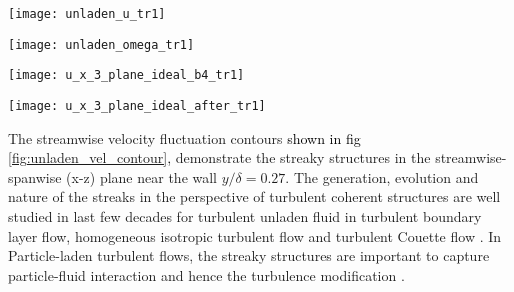 \documentclass[aip,graphicx]{revtex4-1}
\begin{document}
\begin{figure*}[!h]
\centering
\texttt{[image: unladen\_u\_tr1]}
	\caption{Contours of streamwise velocity fluctuations in unladen fluid phase showed in three different planes as shown in the figures} 
	\label{fig:unladen_vel_contour}
\end{figure*}
\begin{figure*}[!h]
\centering
\texttt{[image: unladen\_omega\_tr1]}
	\caption{Contours of streamwise vorticity fluctuations in unladen fluid phase showed in three different planes as shown in the figures} 
	\label{fig:unladen_vort_contour}
\end{figure*}
\begin{figure*}[!h]
\centering
\texttt{[image: u\_x\_3\_plane\_ideal\_b4\_tr1]}
	\caption{Contours of streamwise velocity fluctuations of fluid phase laden with particles of Volume Fraction $\phi_{cr}=7.875X10^{-4}$ showed in three different planes as shown in the figures} 
	\label{fig:ideal_vel_contour_b4_tr}
\end{figure*}
\begin{figure*}[!h]
\centering
\texttt{[image: u\_x\_3\_plane\_ideal\_after\_tr1]}
	\caption{Contours of streamwise velocity fluctuations of fluid phase laden with particles of volume fraction $\phi=8.3125X10^{-4}$ showed in three different planes as shown in the figures} 
	\label{fig:ideal_vel_contour_aftr_tr}
\end{figure*}
The streamwise velocity fluctuation contours \textcolor{black}{shown in fig \ref{fig:unladen_vel_contour},} demonstrate the streaky structures in the streamwise-spanwise (x-z) plane near the wall $y/\delta=0.27$. The generation, evolution and nature of the streaks in the perspective of turbulent coherent structures are  well studied in last few decades for turbulent unladen fluid in turbulent boundary layer flow, \citep*{kline1967structure,praturi1978stereoscopic,head1981new} homogeneous isotropic turbulent flow \citep*{sekimoto2016direct, dong2017coherent} and turbulent Couette flow \cite{papavassiliou1997interpretation,tsukahara2006dns,hwang2010amplification,pirozzoli2011large}. In Particle-laden turbulent flows, the streaky structures are important to capture  particle-fluid interaction and hence the turbulence modification \citep*{hamilton1995regeneration, richter2013momentum, richter2014modification, richter2015turbulence}.
\end{document}
